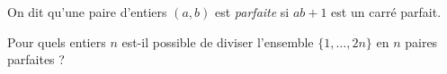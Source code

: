 On dit qu'une paire d'entiers $(a, b)$ est \textit{parfaite} si $ab+1$ est un carré parfait.

Pour quels entiers $n$ est-il possible de diviser l'ensemble $\{1, \dots, 2n\}$ en $n$ paires parfaites ?